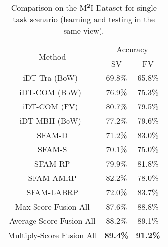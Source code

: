 \documentclass[10pt,twocolumn,letterpaper]{article}
\begin{document}
\begin{table}[!ht]
\centering
\begin{tabular}{|c|c|c|} \hline 
\multirow{2}{*}{Method} 
& \multicolumn{2}{c|}{Accuracy}\\
 \cline{2-3}   
 & SV   & FV   \\ \hline
   iDT-Tra (BoW)~\cite{liu2016benchmarking} &  69.8\%  & 65.8\% \\ \hline
   iDT-COM (BoW)~\cite{liu2016benchmarking} &  76.9\%  & 75.3\% \\ \hline
   iDT-COM (FV)~\cite{liu2016benchmarking} &  80.7\%  & 79.5\% \\ \hline
   iDT-MBH (BoW)~\cite{liu2016benchmarking} & 77.2\%  & 79.6\% \\ \hline\hline
   SFAM-D & 71.2\%  & 83.0\% \\ \hline
   SFAM-S & 70.1\%  & 75.0\% \\ \hline
   SFAM-RP & 79.9\%  & 81.8\% \\ \hline
   SFAM-AMRP & 82.2\%  & 78.0\% \\ \hline
   SFAM-LABRP & 72.0\%  & 83.7\% \\ \hline
   Max-Score Fusion All & 87.6\%  & 88.8\% \\ \hline
   Average-Score Fusion All & 88.2\%  & 89.1\% \\ \hline
   Multiply-Score Fusion All & \textbf{89.4\%}  & \textbf{91.2\%} \\ \hline
\end{tabular}
\caption{Comparison on the M$^{\textbf{2}}$I Dataset for single task scenario 
(learning and testing in the same view). \label{table2}}
\end{table}
\end{document}
